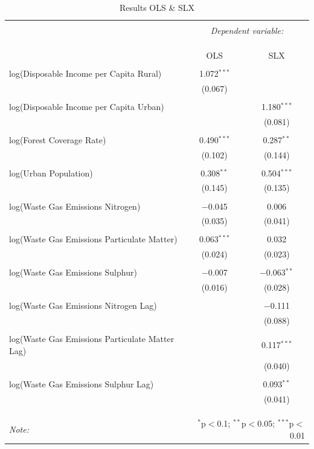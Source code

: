 \documentclass[
]{article}
\begin{document}
\begin{table}[!htbp] \centering 
	\caption{Results OLS \& SLX} 
	\label{} 
	\begin{tabular}{@{\extracolsep{5pt}}lcc} 
		\\[-1.8ex]\hline 
		\hline \\[-1.8ex] 
		& \multicolumn{2}{c}{\textit{Dependent variable:}} \\ 
		\cline{2-3} 
		\\[-1.8ex] & \multicolumn{2}{c}{ } \\ 
		\\[-1.8ex] & OLS & SLX\\ 
		\hline \\[-1.8ex] 
		log(Disposable Income per Capita Rural) & 1.072$^{***}$ &  \\ 
		& (0.067) &  \\ 
		& & \\ 
		log(Disposable Income per Capita Urban) &  & 1.180$^{***}$ \\ 
		&  & (0.081) \\ 
		& & \\ 
		log(Forest Coverage Rate) & 0.490$^{***}$ & 0.287$^{**}$ \\ 
		& (0.102) & (0.144) \\ 
		& & \\ 
		log(Urban Population) & 0.308$^{**}$ & 0.504$^{***}$ \\ 
		& (0.145) & (0.135) \\ 
		& & \\ 
		log(Waste Gas Emissions Nitrogen) & $-$0.045 & 0.006 \\ 
		& (0.035) & (0.041) \\ 
		& & \\ 
		log(Waste Gas Emissions Particulate Matter) & 0.063$^{***}$ & 0.032 \\ 
		& (0.024) & (0.023) \\ 
		& & \\ 
		log(Waste Gas Emissions Sulphur) & $-$0.007 & $-$0.063$^{**}$ \\ 
		& (0.016) & (0.028) \\ 
		& & \\ 
		log(Waste Gas Emissions Nitrogen Lag) &  & $-$0.111 \\ 
		&  & (0.088) \\ 
		& & \\ 
		log(Waste Gas Emissions Particulate Matter Lag) &  & 0.117$^{***}$ \\ 
		&  & (0.040) \\ 
		& & \\ 
		log(Waste Gas Emissions Sulphur Lag) &  & 0.093$^{**}$ \\ 
		&  & (0.041) \\ 
		& & \\ 
		\hline \\[-1.8ex] 
		\hline 
		\hline \\[-1.8ex] 
		\textit{Note:}  & \multicolumn{2}{r}{$^{*}$p$<$0.1; $^{**}$p$<$0.05; $^{***}$p$<$0.01} \\ 
	\end{tabular} 
\end{table} 
\end{document}
